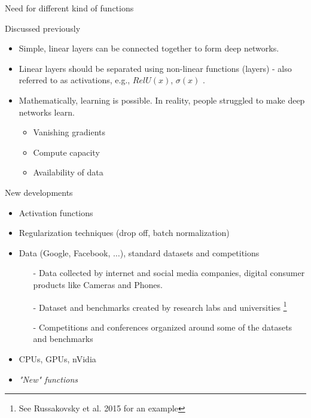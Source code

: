 \begin{frame}{Need for different kind of functions}
	\begin{block}{Discussed previously}
		\begin{itemize}
			\item Simple, linear layers can be connected together to form deep networks.
			\item Linear layers should be separated using non-linear functions (layers) - also referred to as activations, e.g., $RelU(x)$, $\sigma(x)$ .
			\item Mathematically, learning is possible. In reality, people struggled to make 
			deep networks learn.
			\begin{itemize}
				\item Vanishing gradients
				\item Compute capacity 
				\item Availability of data 
			\end{itemize}
		\end{itemize}
	\end{block}
\end{frame}

\begin{frame}{New developments}
	\begin{itemize}
		\item Activation functions  
		\item Regularization techniques (drop off, batch normalization) 
		\item Data (Google, Facebook,  $\dots$), standard datasets and competitions 
		\begin{itemize}
			\item[-] Data collected by internet and social media companies, digital consumer 
			products like Cameras and Phones.  
			\item[-] Dataset and  benchmarks created by research labs and universities
				\footnote[frame]{See Russakovsky et al. 2015 for an example}  
			\item[-] Competitions and conferences organized around some of the datasets and 
			benchmarks  
		\end{itemize}
		\item CPUs, GPUs, nVidia
		\item {\it "New" functions} 
	\end{itemize}

\end{frame}